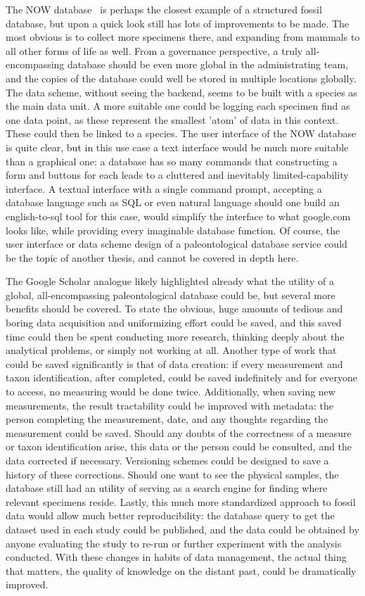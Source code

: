 \documentclass[english,twoside,openright]{UH_DS_MSc}
\begin{document}
The NOW database~\cite{Zliobaite2023} is perhaps the closest example of a structured fossil database, but upon a quick look still has lots of improvements to be made. The most obvious is to collect more specimens there, and expanding from mammals to all other forms of life as well. From a governance perspective, a truly all-encompassing database should be even more global in the administrating team, and the copies of the database could well be stored in multiple locations globally. The data scheme, without seeing the backend, seems to be built with a species as the main data unit. A more suitable one could be logging each specimen find as one data point, as these represent the smallest 'atom' of data in this context. These could then be linked to a species. The user interface of the NOW database is quite clear, but in this use case a text interface would be much more suitable than a graphical one: a database has so many commands that constructing a form and buttons for each leads to a cluttered and inevitably limited-capability interface. A textual interface with a single command prompt, accepting a database language such as SQL or even natural language should one build an english-to-sql tool for this case, would simplify the interface to what google.com looks like, while providing every imaginable database function. Of course, the user interface or data scheme design of a paleontological database service could be the topic of another thesis, and cannot be covered in depth here.

The Google Scholar analogue likely highlighted already what the utility of a global, all-encompassing paleontological database could be, but several more benefits should be covered. To state the obvious, huge amounts of tedious and boring data acquisition and uniformizing effort could be saved, and this saved time could then be spent conducting more research, thinking deeply about the analytical problems, or simply not working at all. Another type of work that could be saved significantly is that of data creation: if every measurement and taxon identification, after completed, could be saved indefinitely and for everyone to access, no measuring would be done twice. Additionally, when saving new measurements, the result tractability could be improved with metadata: the person completing the measurement, date, and any thoughts regarding the measurement could be saved. Should any doubts of the correctness of a measure or taxon identification arise, this data or the person could be consulted, and the data corrected if necessary. Versioning schemes could be designed to save a history of these corrections. Should one want to see the physical samples, the database still had an utility of serving as a search engine for finding where relevant specimens reside. Lastly, this much more standardized approach to fossil data would allow much better reproducibility: the database query to get the dataset used in each study could be published, and the data could be obtained by anyone evaluating the study to re-run or further experiment with the analysis conducted. With these changes in habits of data management, the actual thing that matters, the quality of knowledge on the distant past, could be dramatically improved.
\end{document}
